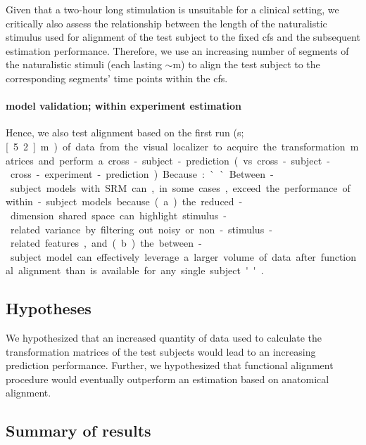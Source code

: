 Given that a two-hour long stimulation is unsuitable for a clinical setting, we
critically also assess the relationship between the length of the naturalistic
stimulus used for alignment of the test subject to the fixed \ac{cfs} and the
subsequent estimation performance.
%
Therefore, we use an increasing number of segments of the naturalistic stimuli
(each lasting $\sim$\unit[15]{m}) to align the test subject to the corresponding
segments' time points within the \ac{cfs}.


\paragraph{model validation; within experiment estimation}


%
Hence, we also test alignment based on the first run (\unit[312]{s};
\unit[5.2]{m}) of data from the visual localizer to acquire the transformation
matrices and perform a cross-subject-prediction (vs.
cross-subject-cross-experiment-prediction).
%
Because: ``Between-subject models with SRM can, in some cases, exceed the
performance of within-subject models because (a) the reduced-dimension shared
space can highlight stimulus-related variance by filtering out noisy or
non-stimulus-related features, and (b) the between-subject model can effectively
leverage a larger volume of data after functional alignment than is available
for any single subject'' \citep{kumar2020brainiak}.


\subsection{Hypotheses}

%
We hypothesized that an increased quantity of data used to calculate the
transformation matrices of the test subjects would lead to an increasing
prediction performance.
%
Further, we hypothesized that functional alignment procedure would eventually
outperform an estimation based on anatomical alignment.


\subsection{Summary of results}



